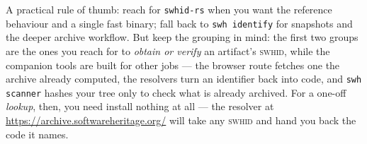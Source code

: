 \noindent A practical rule of thumb: reach for \texttt{swhid-rs} when you want the
reference behaviour and a single fast binary; fall back to \texttt{swh identify} for snapshots and
the deeper archive workflow. But keep the grouping in mind: the first two groups are the ones you
reach for to \emph{obtain or verify} an artifact's \textsc{swhid}, while the companion tools are built
for other jobs --- the browser route fetches one the archive already computed, the resolvers turn an
identifier back into code, and \texttt{swh scanner} hashes your tree only to check what is already
archived.
For a one-off \emph{lookup}, then, you need install nothing at all --- the resolver at
\url{https://archive.softwareheritage.org/} will take any \textsc{swhid} and hand you back the code it
names.
